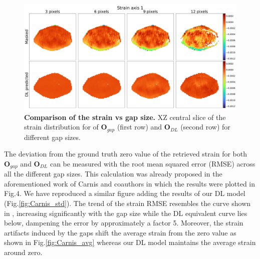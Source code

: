 \begin{figure}[H]
    \centering
    \includegraphics[width=\textwidth]{figures/Inpainting/strain_comparison_allGaps.pdf}
    \caption{\textbf{Comparison of the strain vs gap size.} XZ central slice of the strain distribution for of $\textbf{O}_{gap}$
    (first row) and $\textbf{O}_{DL}$ (second row) for different gap sizes.}
    \label{fig:Carnis_allgaps_strain}
\end{figure}

The deviation from the ground truth zero value of the retrieved strain for both $\mathbf{O}_{gap}$ and $\mathbf{O}_{DL}$
can be measured with the root mean squared error (RMSE) across all the different gap sizes. This calculation was already
proposed in the aforementioned work of Carnis and coauthors in which the results were plotted in Fig.4. We have reproduced
a similar figure adding the results of our DL model (Fig.\ref{fig:Carnis_std}). The trend of the strain RMSE 
resembles the curve shown in \cite{carnis_towards_2019}, increasing significantly with the gap size 
while the DL equivalent curve lies below, dampening the error by approximately a factor 5. Moreover, the strain artifacts
induced by the gaps shift the average strain from the zero value as shown in Fig.\ref{fig:Carnis_avg} whereas our DL model 
maintains the average strain around zero.


